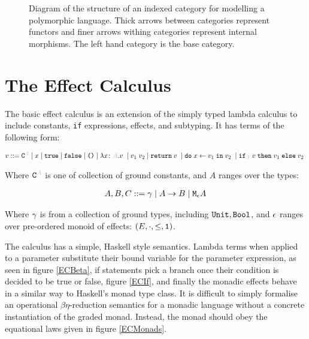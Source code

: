 \documentclass{Report}
\begin{document}
\begin{figure}[ht!]
{
    }
    
    \caption{Diagram of the structure of an indexed category for modelling a polymorphic language. Thick arrows between categories represent functors and finer arrows withing categories represent internal morphisms. The left hand category is the base category.
    }
    \label{IndexDiagram}
\end{figure}


\section{The Effect Calculus}

The basic effect calculus is an extension of the simply typed lambda calculus to include constants, \texttt{if} expressions, effects, and subtyping. It has terms of the following form:

\begin{align*}
    v ::= \const{A} \mid x\mid \t \mid\f \mid\u\mid\lam{x}{A}{v}\mid\apply{v_1}{v_2}\mid\return{v}\mid\doin{x}{v_1}{v_2}\mid\pifthenelse{A}{v}{v_1}{v_2} 
\end{align*}

Where $\const{A}$ is one of collection of ground constants, and $A$ ranges over the types:

\begin{align*}
    A, B, C ::= \gamma\mid A\rightarrow B \mid\texttt{M}_{\epsilon}{A}
\end{align*}

Where $\gamma$ is from a collection of ground types, including $\texttt{Unit}, \texttt{Bool}$, and $\epsilon$ ranges over pre-ordered monoid of effects: $(E, \cdot, \leq, \texttt{1})$.

The calculus has a simple, Haskell style semantics. Lambda terms when applied to a parameter substitute their bound variable for the parameter expression, as seen in figure \ref{ECBeta}, if statements pick a branch once their condition is decided to be true or false, figure \ref{ECIf}, and finally the monadic effects behave in a similar way to Haskell's monad type class. It is difficult to simply formalise an operational $\beta\eta$-reduction semantics for a monadic language without a concrete instantiation of the graded monad. Instead, the monad should obey the equational laws given in figure \ref{ECMonads}.
\end{document}
